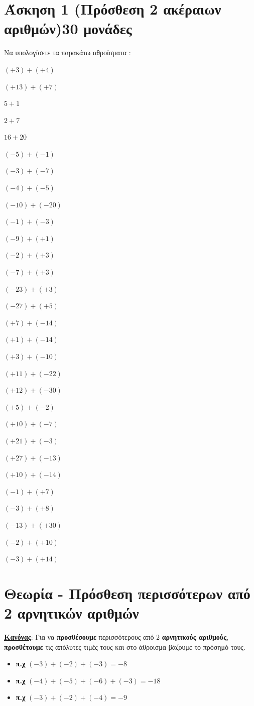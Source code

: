 \documentclass[a4paper,10pt]{report}
\begin{document}
\section*{Άσκηση 1  (Πρόσθεση 2 ακέραιων αριθμών)\hfill \small{30 μονάδες}}
Να υπολογίσετε τα παρακάτω αθροίσματα :
\begin{enumerate}[1)]
\begin{multicols}{3}
 \item $(+3)+(+4)$
 \item $(+13)+(+7)$
 \item $5+1$
 \item $2+7$
 \item $16+20$
 \item $(-5)+(-1)$
 \item $(-3)+(-7)$
 \item $(-4)+(-5)$
 \item $(-10)+(-20)$
 \item $(-1)+(-3)$
 \item $(-9)+(+1)$
 \item $(-2)+(+3)$
 \item $(-7)+(+3)$
 \item $(-23)+(+3)$
 \item $(-27)+(+5)$
 \item $(+7)+(-14)$
 \item $(+1)+(-14)$
 \item $(+3)+(-10)$
 \item $(+11)+(-22)$
 \item $(+12)+(-30)$
 \item $(+5)+(-2)$
 \item $(+10)+(-7)$
 \item $(+21)+(-3)$
 \item $(+27)+(-13)$
 \item $(+10)+(-14)$
 \item $(-1)+(+7)$
 \item $(-3)+(+8)$
 \item $(-13)+(+30)$
 \item $(-2)+(+10)$
 \item $(-3)+(+14)$
\end{multicols}
\end{enumerate}

\section*{Θεωρία - Πρόσθεση περισσότερων από 2 αρνητικών αριθμών\hfill \small{}}
\textbf{\underline{Κανόνας}}: Για να \textbf{προσθέσουμε} περισσότερους από 2 \textbf{αρνητικούς αριθμούς}, 
\textbf{προσθέτουμε} τις απόλυτες τιμές τους και στο άθροισμα βάζουμε το πρόσημό τους.
\begin{itemize}
 \item \textbf{π.χ} $(-3)+(-2)+(-3)=-8$
 \item \textbf{π.χ} $(-4)+(-5)+(-6)+(-3)=-18$
 \item \textbf{π.χ} $(-3)+(-2)+(-4)=-9$
\end{itemize}
\end{document}
